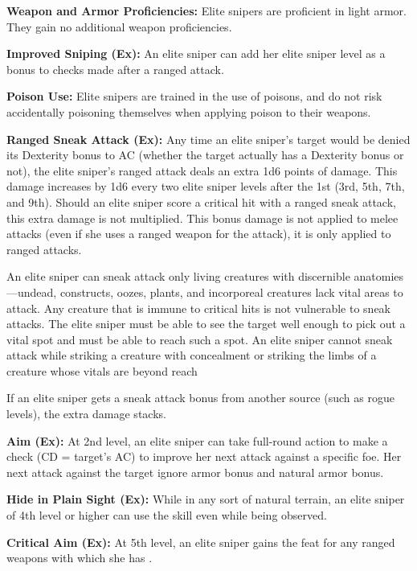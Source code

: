 {
\textbf{Weapon and Armor Proficiencies:} Elite snipers are proficient in light armor. They gain no additional weapon proficiencies.

\textbf{Improved Sniping (Ex):} An elite sniper can add her elite sniper level as a bonus to  checks made after a ranged attack.

\textbf{Poison Use:} Elite snipers are trained in the use of poisons, and do not risk accidentally poisoning themselves when applying poison to their weapons.

\textbf{Ranged Sneak Attack (Ex):} Any time an elite sniper's target would be denied its Dexterity bonus to AC (whether the target actually has a Dexterity bonus or not), the elite sniper's ranged attack deals an extra 1d6 points of damage. This damage increases by 1d6 every two elite sniper levels after the 1st (3rd, 5th, 7th, and 9th). Should an elite sniper score a critical hit with a ranged sneak attack, this extra damage is not multiplied. This bonus damage is not applied to melee attacks (even if she uses a ranged weapon for the attack), it is only applied to ranged attacks.

An elite sniper can sneak attack only living creatures with discernible anatomies---undead, constructs, oozes, plants, and incorporeal creatures lack vital areas to attack. Any creature that is immune to critical hits is not vulnerable to sneak attacks. The elite sniper must be able to see the target well enough to pick out a vital spot and must be able to reach such a spot. An elite sniper cannot sneak attack while striking a creature with concealment or striking the limbs of a creature whose vitals are beyond reach\

If an elite sniper gets a sneak attack bonus from another source (such as rogue levels), the extra damage stacks.

\textbf{Aim (Ex):} At 2nd level, an elite sniper can take full-round action to make a  check (CD = target's AC) to improve her next attack against a specific foe. Her next attack against the target ignore armor bonus and natural armor bonus.

\textbf{Hide in Plain Sight (Ex):} While in any sort of natural terrain, an elite sniper of 4th level or higher can use the  skill even while being observed.

\textbf{Critical Aim (Ex):} At 5th level, an elite sniper gains the  feat for any ranged weapons with which she has .

}
